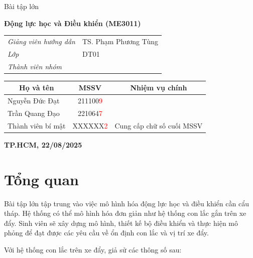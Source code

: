 \documentclass[12pt,a4paper]{article}
\begin{document}
\begin{titlepage}
\begin{center}
    \vspace{2\baselineskip}

    {\LARGE Bài tập lớn}

    \vspace{0.5\baselineskip}
    
    \textbf{\LARGE Động lực học và Điều khiển (ME3011)}

    
    \vfill

    \begin{tabular}{ll}
        \textit{Giảng viên hướng dẫn} &  TS. Phạm Phương Tùng\\
        \textit{Lớp} & DT01\\
        \textit{Thành viên nhóm} & 
    \end{tabular}

    \begin{tabularx}{0.75\linewidth}{|X|c|c|}
        \hline
        \multicolumn{1}{|c|}{\textbf{\textbf{Họ và tên}}} & \textbf{MSSV} & \multicolumn{1}{c|}{\textbf{Nhiệm vụ chính}}\\ \hline
        Nguyễn Đức Đạt & 211100\textcolor{red}{9} & \\ \hline
        Trần Quang Đạo & 221064\textcolor{red}{7} & \\ \hline
        Thành viên bí mật & XXXXXX\textcolor{red}{2} & Cung cấp chữ số cuối MSSV\\ \hline
    \end{tabularx}

    \vspace{3\baselineskip}

    \textbf{TP.HCM, 22/08/2025}
    \vspace{\baselineskip}
\end{center}
\end{titlepage}

\newpage

\tableofcontents
\newpage

\section{Tổng quan}
Bài tập lớn tập trung vào việc mô hình hóa động lực học và điều khiển cần cẩu tháp. Hệ thống 
có thể mô hình hóa đơn giản như hệ thống con lắc gắn trên xe đẩy. Sinh viên sẽ xây dựng mô 
hình, thiết kế bộ điều khiển và thực hiện mô phỏng để đạt được các yêu cầu về ổn định con lắc 
và vị trí xe đẩy.  

Với hệ thống con lắc trên xe đẩy, giả sử các thông số sau: 
\end{document}
